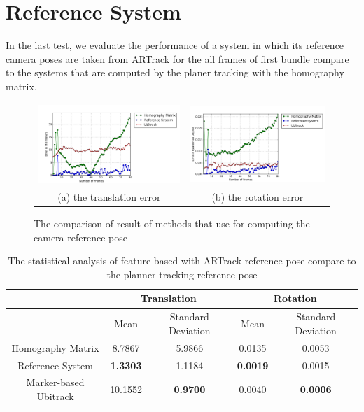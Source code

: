 \section{Reference System} \label{sec:refrence_system}
In the last test, we evaluate the performance of a system in which its reference camera poses are taken from ARTrack for the all frames of first bundle compare to the systems that are computed by the planer tracking with the homography matrix.
\begin{figure}[H]
\begin{tabular}{cc}
  \includegraphics[width=80mm]{figures/homo/graph_translation} &  \includegraphics[width=80mm]{figures/homo/graph_rotation} \\
	(a) the translation error & (b) the rotation error \\[6pt]
\end{tabular}
\caption{The comparison of result of methods that use for computing the camera reference pose }\label{fig:diff_reference}
\end{figure}

\begin{table}[H]
\centering
  \begin{tabular}{| c || c | c | c | c |}
      \hline
      & \multicolumn{2}{c|}{Translation} & \multicolumn{2}{c|}{Rotation} \\ \hline
       & Mean & Standard Deviation & Mean & Standard Deviation \\ \hline
      Homography Matrix & 8.7867 & 5.9866 & 0.0135 & 0.0053 \\ \hline
      Reference System & \textbf{1.3303} & 1.1184 & \textbf{0.0019} & 0.0015 \\ \hline
      Marker-based Ubitrack & 10.1552 & \textbf{0.9700} & 0.0040 & \textbf{0.0006} \\ \hline
  \end{tabular}
  \caption{The statistical analysis of feature-based with ARTrack reference pose compare to the planner tracking reference pose} \label{tab:reference_system}
\end{table}

